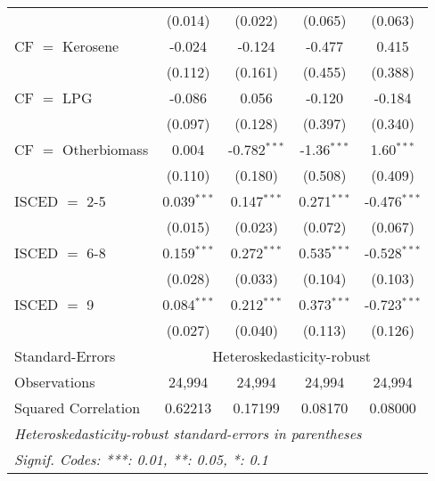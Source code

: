 \begin{table}[htbp!]
\begin{adjustbox}{width = 1\textwidth, max height = 0.95\textheight, center}
\begin{threeparttable}[b]
\begin{tabular}{lcccc}
                                 & (0.014)            & (0.022)            & (0.065)       & (0.063)\\   
            CF $=$ Kerosene      & -0.024             & -0.124             & -0.477        & 0.415\\   
                                 & (0.112)            & (0.161)            & (0.455)       & (0.388)\\   
            CF $=$ LPG           & -0.086             & 0.056              & -0.120        & -0.184\\   
                                 & (0.097)            & (0.128)            & (0.397)       & (0.340)\\   
            CF $=$ Otherbiomass  & 0.004              & -0.782$^{***}$     & -1.36$^{***}$ & 1.60$^{***}$\\   
                                 & (0.110)            & (0.180)            & (0.508)       & (0.409)\\   
            ISCED $=$ 2-5        & 0.039$^{***}$      & 0.147$^{***}$      & 0.271$^{***}$ & -0.476$^{***}$\\   
                                 & (0.015)            & (0.023)            & (0.072)       & (0.067)\\   
            ISCED $=$ 6-8        & 0.159$^{***}$      & 0.272$^{***}$      & 0.535$^{***}$ & -0.528$^{***}$\\   
                                 & (0.028)            & (0.033)            & (0.104)       & (0.103)\\   
            ISCED $=$ 9          & 0.084$^{***}$      & 0.212$^{***}$      & 0.373$^{***}$ & -0.723$^{***}$\\   
                                 & (0.027)            & (0.040)            & (0.113)       & (0.126)\\   
            \midrule 
            Standard-Errors & \multicolumn{4}{c}{Heteroskedasticity-robust} \\ 
            Observations         & 24,994             & 24,994             & 24,994        & 24,994\\  
            Squared Correlation  & 0.62213            & 0.17199            & 0.08170       & 0.08000\\  
            \midrule \midrule
            \multicolumn{5}{l}{\emph{Heteroskedasticity-robust standard-errors in parentheses}}\\
            \multicolumn{5}{l}{\emph{Signif. Codes: ***: 0.01, **: 0.05, *: 0.1}}\\
         \end{tabular}
         

\end{threeparttable}
\end{adjustbox}
\end{table}
